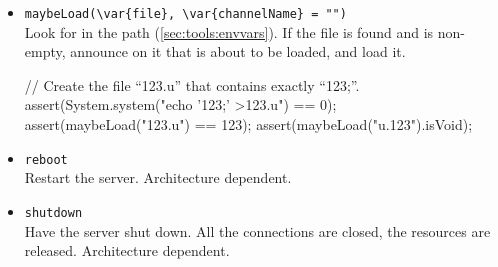 \begin{itemize}
\item \lstinline|maybeLoad(\var{file}, \var{channelName} = "")|\\
  Look for  in the \urbi path
  (\autoref{sec:tools:envvars}).  If the file is found and
   is non-empty, announce on it that  is
  about to be loaded, and load it.

\begin{urbiscript}[firstnumber=last]
// Create the file ``123.u'' that contains exactly ``123;''.
assert(System.system("echo '123;' >123.u") == 0);
assert(maybeLoad("123.u") == 123);
assert(maybeLoad("u.123").isVoid);
\end{urbiscript}

\item \lstinline'reboot'\\
  Restart the \urbi server.  Architecture dependent.

\item \lstinline'shutdown'\\
  Have the \urbi server shut down.  All the connections are closed,
  the resources are released.  Architecture dependent.
\end{itemize}

